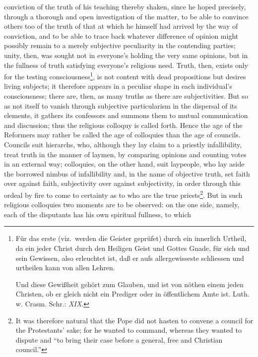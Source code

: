 \documentclass[12pt]{book}
\newcommand{\opage}[1]{\marginnote{\footnotesize\textit{[#1]}}}
\begin{document}
conviction
\opage{69} \setcounter{footnote}{0}%
of the truth of his teaching thereby shaken, since he hoped precisely,
through a thorough and open investigation of the matter, to be able to
convince others too of the truth of that at which he himself had arrived by
the way of conviction, and to be able to trace back whatever difference of
opinion might possibly remain to a merely subjective peculiarity in the
contending parties; unity, then, was sought not in everyone's holding the
very same opinions, but in the fullness of truth satisfying everyone's
religious need. Truth, then, exists only for the testing
consciousness\footnote{Für das erste (viz.\ werden die Geister
geprüfet) durch ein innerlich Urtheil, da ein jeder Christ durch den Heiligen
Geist und Gottes Gnade, für sich und sein Gewissen, also erleuchtet ist, daß
er aufs allergewisseste schliessen und urtheilen kann von allen Lehren.

Und diese Gewißheit gehört zum Glauben, und ist von nöthen einem jeden
Christen, ob er gleich nicht ein Prediger oder in öffentlichem Amte ist. Luth.
w. Crasm. Schr.: \textit{XIX}.}, is not content with dead propositions but
desires living subjects; it therefore appears in a peculiar shape in each
individual's consciousness; there are, then, as many truths as there are
subjectivities. But so as not itself to vanish through subjective
particularism in the dispersal of its elements, it gathers its confessors and
summons them to mutual communication and discussion; thus the religious
colloquy is called forth. Hence the age of the Reformers may rather be called
the age of colloquies than the age of councils. Councils suit hierarchs, who,
although they lay claim to a priestly infallibility, treat truth in the
manner of laymen, by comparing opinions and counting votes in an external
way; colloquies, on the other hand, suit laypeople, who lay aside the
borrowed nimbus of infallibility and, in the name of objective truth, set
faith over against faith, subjectivity over against subjectivity, in order
through this ordeal by fire to come
\opage{70} \setcounter{footnote}{0}%
to certainty as to who are the true priests\footnote{It was therefore
natural that the Pope did not hasten to convene a council for the
Protestants' sake; for he wanted to command, whereas they wanted to dispute
and ``to bring their case before a general, free and Christian council.''}.
But in such religious colloquies two moments are to be observed: on the one
side, namely, each of the disputants has his own spiritual fullness, to which
\end{document}
